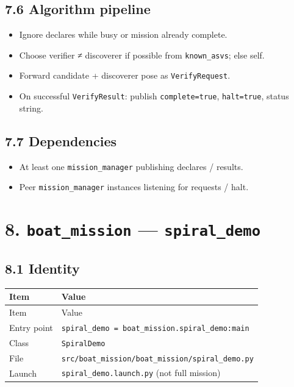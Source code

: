 \subsection{7.6 Algorithm pipeline}


\begin{itemize}[leftmargin=*]
\item Ignore declares while busy or mission already complete.
\item Choose verifier ≠ discoverer if possible from \texttt{known\_asvs}; else self.
\item Forward candidate + discoverer pose as \texttt{VerifyRequest}.
\item On successful \texttt{VerifyResult}: publish \texttt{complete=true}, \texttt{halt=true}, status string.
\end{itemize}


\subsection{7.7 Dependencies}


\begin{itemize}[leftmargin=*]
\item At least one \texttt{mission\_manager} publishing declares / results.
\item Peer \texttt{mission\_manager} instances listening for requests / halt.
\end{itemize}




\section{8. \texttt{boat\_mission} --- \texttt{spiral\_demo}}


\subsection{8.1 Identity}


\begin{center}
\small
\begin{longtable}{@{}lp{10cm}@{}}
\toprule
Item & Value \\
\midrule
\endfirsthead
\toprule
Item & Value \\
\midrule
\endhead
Entry point & \texttt{spiral\_demo = boat\_mission.spiral\_demo:main} \\
Class & \texttt{SpiralDemo} \\
File & \texttt{src/boat\_mission/boat\_mission/spiral\_demo.py} \\
Launch & \texttt{spiral\_demo.launch.py} (not full mission) \\
\bottomrule
\end{longtable}
\end{center}


